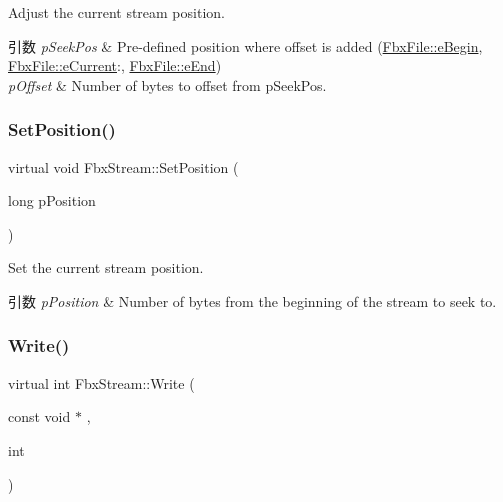 Adjust the current stream position. 
\begin{DoxyParams}{引数}
{\em p\+Seek\+Pos} & Pre-\/defined position where offset is added (\hyperlink{class_fbx_file_aba91fe59f9c0a4c84a92f13c0c27deeca7a474ae0aa6f46b8becdfe54208f928e}{Fbx\+File\+::e\+Begin}, \hyperlink{class_fbx_file_aba91fe59f9c0a4c84a92f13c0c27deecaf2653dc9849e794feee37a015d80b098}{Fbx\+File\+::e\+Current}\+:, \hyperlink{class_fbx_file_aba91fe59f9c0a4c84a92f13c0c27deeca1ab3eb84e8694fd4e63d0c864b12508d}{Fbx\+File\+::e\+End}) \\
\hline
{\em p\+Offset} & Number of bytes to offset from p\+Seek\+Pos. \\
\hline
\end{DoxyParams}
\mbox{\label{class_fbx_stream_aeb8843a4daec9d82187cc3eea5bb9baa}} 
\subsubsection{\texorpdfstring{Set\+Position()}{SetPosition()}}
{\footnotesize\ttfamily virtual void Fbx\+Stream\+::\+Set\+Position (\begin{DoxyParamCaption}\item[{long}]{p\+Position }\end{DoxyParamCaption})\hspace{0.3cm}{\ttfamily [pure virtual]}}

Set the current stream position. 
\begin{DoxyParams}{引数}
{\em p\+Position} & Number of bytes from the beginning of the stream to seek to. \\
\hline
\end{DoxyParams}
\mbox{\label{class_fbx_stream_a0bd0142e0acd244bc4342381c28b7a9a}} 
\subsubsection{\texorpdfstring{Write()}{Write()}\hspace{0.1cm}{\footnotesize\ttfamily [1/3]}}
{\footnotesize\ttfamily virtual int Fbx\+Stream\+::\+Write (\begin{DoxyParamCaption}\item[{const void $\ast$}]{,  }\item[{int}]{ }\end{DoxyParamCaption})\hspace{0.3cm}{\ttfamily [pure virtual]}}


